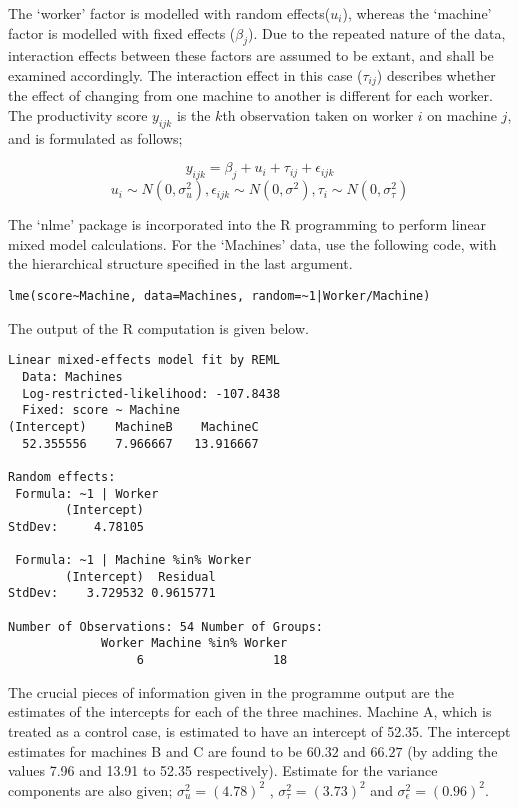 \documentclass[12pt, a4paper]{report}
\begin{document}
The `worker' factor is modelled with random effects($u_{i}$),
whereas the `machine' factor is modelled with fixed effects
($\beta_{j}$). Due to the repeated nature of the data, interaction
effects between these factors are assumed to be extant, and shall
be examined accordingly. The interaction effect in this case
($\tau_{ij}$) describes whether the effect of changing from one
machine to another is different for each worker. The productivity
score $y_{ijk}$ is the $k$th observation taken on worker $i$ on
machine $j$, and is formulated
 as follows;

\begin{equation}
y_{ijk} = \beta_{j} + u_{i} + \tau_{ij} + \epsilon_{ijk}
\end{equation}
\begin{equation*}
u_{i} \sim N(0, \sigma^{2}_{u}), \epsilon_{ijk} \sim N(0,
\sigma^{2}), \tau_{i} \sim N(0, \sigma^{2}_{\tau})
\end{equation*}

The `nlme' package is incorporated into the R programming to
perform linear mixed model calculations. For the `Machines' data,
\citet{pb} use the following code, with the hierarchical structure
specified in the last argument.
\begin{verbatim}
lme(score~Machine, data=Machines, random=~1|Worker/Machine)
\end{verbatim}


The output of the R computation is given below.
\begin{verbatim}
Linear mixed-effects model fit by REML
  Data: Machines
  Log-restricted-likelihood: -107.8438
  Fixed: score ~ Machine
(Intercept)    MachineB    MachineC
  52.355556    7.966667   13.916667

Random effects:
 Formula: ~1 | Worker
        (Intercept)
StdDev:     4.78105

 Formula: ~1 | Machine %in% Worker
        (Intercept)  Residual
StdDev:    3.729532 0.9615771

Number of Observations: 54 Number of Groups:
             Worker Machine %in% Worker
                  6                  18

\end{verbatim}

\newpage
The crucial pieces of information given in the programme output
are the estimates of the intercepts for each of the three
machines. Machine A, which is treated as a control case, is
estimated to have an intercept of 52.35. The intercept estimates
for machines B and C are found to be $60.32$ and $66.27$ (by
adding the values 7.96 and 13.91 to 52.35 respectively). Estimate
for the variance components are also given; $\sigma^{2}_{u} =
(4.78)^{2}$ , $\sigma^{2}_{\tau} = (3.73)^{2}$ and
$\sigma^{2}_{\epsilon} = (0.96)^{2}$.
\end{document}
